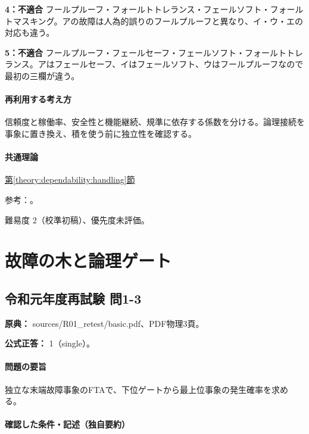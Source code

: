 \noindent\textbf{4：不適合} フールプルーフ・フォールトトレランス・フェールソフト・フォールトマスキング。アの故障は人為的誤りのフールプルーフと異なり、イ・ウ・エの対応も違う。\par

\noindent\textbf{5：不適合} フールプルーフ・フェールセーフ・フェールソフト・フォールトトレランス。アはフェールセーフ、イはフェールソフト、ウはフールプルーフなので最初の三欄が違う。\par

\paragraph{再利用する考え方} 信頼度と稼働率、安全性と機能継続、規準に依存する係数を分ける。論理接続を事象に置き換え、積を使う前に独立性を確認する。

\paragraph{共通理論} \hyperref[theory:dependability:handling]{第\ref*{theory:dependability:handling}節}

\par 参考：\cite{design_mhlw_foolproof,design_mhlw_failsafe,design_nasa_tolerance}。

\par 難易度 2（校準初稿）、優先度未評価。

\section{故障の木と論理ゲート}

\subsection{令和元年度再試験 問1-3}
\label{q:r01-ret-basic-1-3}

\noindent\textbf{原典：} sources/R01\_retest/basic.pdf、PDF物理3頁。

\textbf{公式正答：} 1（single）。

\paragraph{問題の要旨} 独立な末端故障事象のFTAで、下位ゲートから最上位事象の発生確率を求める。

\paragraph{確認した条件・記述（独自要約）}\mbox{}\par

